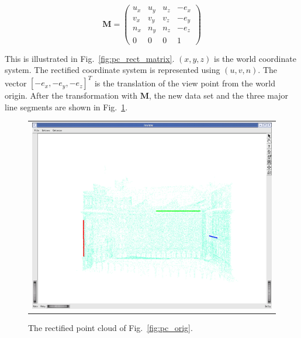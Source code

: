 \documentclass[12pt,letterpaper]{article}
\newcommand{\Fig}[1]{Fig.~\ref{fig:#1}}
\begin{document}
\begin{equation*}
\mathbf{M} = \left(
\begin{array}{cccc}
u_x & u_y & u_z & -e_x \\
v_x & v_y & v_z & -e_y \\
n_x & n_y & n_z & -e_z \\
  0 &   0 &   0 &    1 
\end{array} \right)
\end{equation*}

This is illustrated in \Fig{pc_rect_matrix}. $(x, y, z)$ is the world coordinate system.
The rectified coordinate system is represented using $(u, v, n)$. 
The vector $[-e_x, -e_y, -e_z]^T$ is the translation of the view point from the world origin.
After the transformation with $\mathbf{M}$, the new data set and the three major line segments are
shown in \Fig{pc_rect}.

\begin{figure}[htbp]
\begin{center}
\begin{tabular}{c}
\includegraphics[width=\textwidth]{point_cloud_rectified.png}
\end{tabular}
\end{center}
\caption{ The rectified point cloud of \Fig{pc_orig}. }
\label{fig:pc_rect}
\end{figure}


\end{document}
